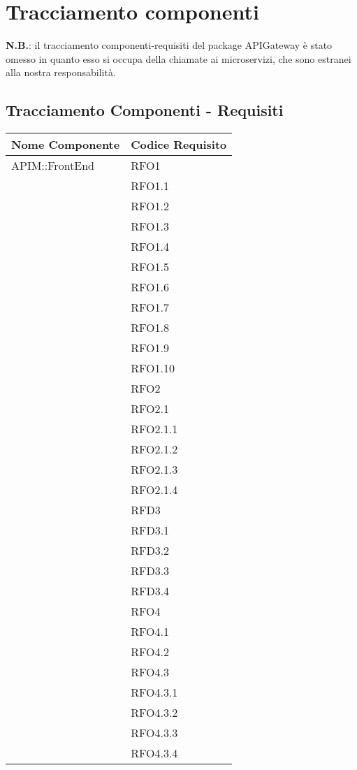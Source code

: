 \newpage
\renewcommand*{\arraystretch}{1.6}

\section{Tracciamento componenti}

\textbf{N.B.}: il tracciamento componenti-requisiti del package APIGateway è stato omesso in quanto esso si occupa della chiamate ai microservizi, che sono estranei alla nostra responsabilità.
\subsection{Tracciamento Componenti - Requisiti}
		\begin{longtable}{ p{12cm} | p{4cm} }
			\hline \rowcolor{Gray}
			\textbf{Nome Componente} & \textbf{Codice Requisito} \\
			\hline
			APIM::FrontEnd
			& RFO1 \\
			& RFO1.1 \\
			& RFO1.2 \\
			& RFO1.3 \\
			& RFO1.4 \\
			& RFO1.5 \\
			& RFO1.6 \\
			& RFO1.7 \\
			& RFO1.8 \\
			& RFO1.9 \\
			& RFO1.10 \\
			& RFO2 \\
			& RFO2.1 \\
			& RFO2.1.1 \\
			& RFO2.1.2 \\
			& RFO2.1.3 \\
			& RFO2.1.4 \\
			& RFD3 \\
			& RFD3.1 \\
			& RFD3.2 \\
			& RFD3.3 \\
			& RFD3.4 \\
			& RFO4 \\
			& RFO4.1 \\
			& RFO4.2 \\
			& RFO4.3 \\
			& RFO4.3.1 \\
			& RFO4.3.2 \\
			& RFO4.3.3 \\
			& RFO4.3.4 \\

\end{longtable}
